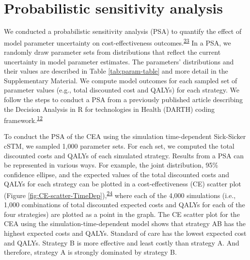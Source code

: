 \documentclass[
]{article}
\begin{document}
\hypertarget{probabilistic-sensitivity-analysis}{%
\section{Probabilistic sensitivity analysis}\label{probabilistic-sensitivity-analysis}}

We conducted a probabilistic sensitivity analysis (PSA) to quantify the effect of model parameter uncertainty on cost-effectiveness outcomes.\textsuperscript{\protect\hyperlink{ref-Briggs2012}{23}} In a PSA, we randomly draw parameter sets from distributions that reflect the current uncertainty in model parameter estimates. The parameters' distributions and their values are described in Table \ref{tab:param-table} and more detail in the Supplementary Material. We compute model outcomes for each sampled set of parameter values (e.g., total discounted cost and QALYs) for each strategy. We follow the steps to conduct a PSA from a previously published article describing the Decision Analysis in R for technologies in Health (DARTH) coding framework.\textsuperscript{\protect\hyperlink{ref-Alarid-Escudero2019e}{12}}

To conduct the PSA of the CEA using the simulation time-dependent Sick-Sicker cSTM, we sampled 1,000 parameter sets. For each set, we computed the total discounted costs and QALYs of each simulated strategy. Results from a PSA can be represented in various ways. For example, the joint distribution, 95\% confidence ellipse, and the expected values of the total discounted costs and QALYs for each strategy can be plotted in a cost-effectiveness (CE) scatter plot (Figure \ref{fig:CE-scatter-TimeDep}),\textsuperscript{\protect\hyperlink{ref-Briggs2002}{24}} where each of the 4,000 simulations (i.e., 1,000 combinations of total discounted expected costs and QALYs for each of the four strategies) are plotted as a point in the graph. The CE scatter plot for the CEA using the simulation-time-dependent model shows that strategy AB has the highest expected costs and QALYs. Standard of care has the lowest expected cost and QALYs. Strategy B is more effective and least costly than strategy A. And therefore, strategy A is strongly dominated by strategy B.
\end{document}
